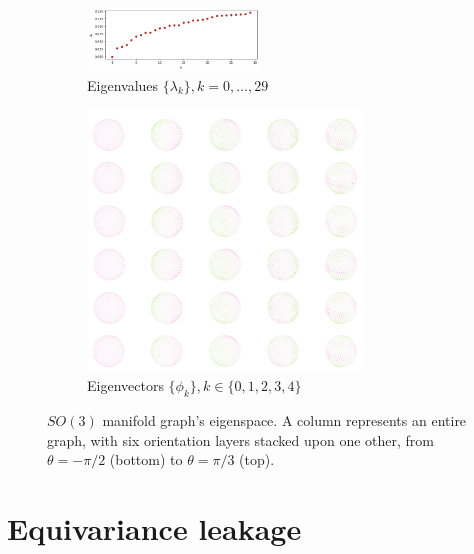\documentclass{article}
\begin{document}
\begin{figure}[h!] 
    \centering
    \begin{subfigure}[b]{0.9\textwidth}
        \centering
        \includegraphics[width=0.5\textwidth]{Images/so3_eigenvals.png}
        \caption{Eigenvalues $\{\lambda_k\}, k=0, \dots, 29$}
    \end{subfigure}
    \hfill
    \begin{subfigure}[b]{\textwidth}
        \centering
        \includegraphics[width=0.8\textwidth]{Images/so3_eigenvecs.png}
        \caption{Eigenvectors $\{\phi_k\}, k \in \{0, 1, 2, 3, 4\}$}
    \end{subfigure}
    \caption{$SO(3)$ manifold graph's eigenspace. A column represents an entire graph, with six orientation layers stacked upon one other, from $\theta = -\pi/2$ (bottom) to $\theta = \pi/3$ (top).}
    \label{fig:so3_eigenspace}
\end{figure}

\clearpage

\section{Equivariance leakage} \label{app:equivariance_leakage}
\end{document}
